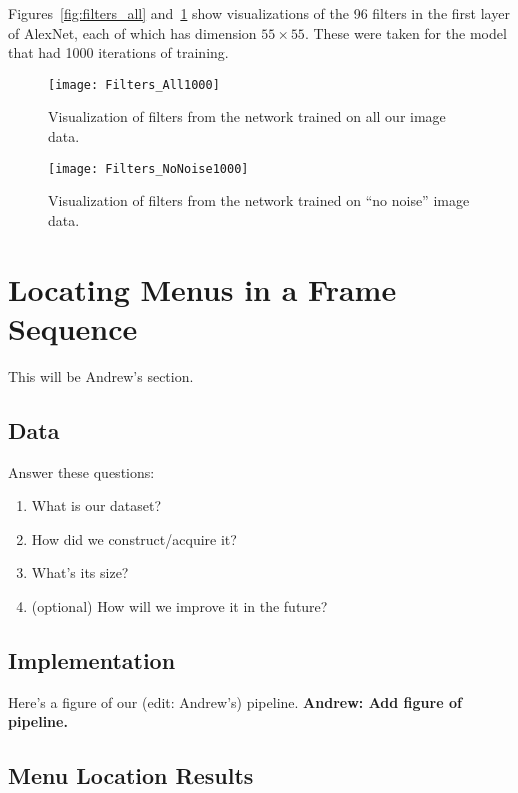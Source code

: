 \documentclass[10pt]{article}
\begin{document}
Figures~\ref{fig:filters_all} and~\ref{fig:filters_nonoise} show visualizations of the 96 filters in
the first layer of AlexNet, each of which has dimension $55\times 55$. These were taken for the
model that had 1000 iterations of training.

\begin{figure}[b]
\centering
  \begin{minipage}{.45\textwidth}
  \centering
  \texttt{[image: Filters\_All1000]}
  \caption{Visualization of filters from the network trained on all our image data.}
  \label{fig:filters_all}
  \end{minipage}\hfill
  \begin{minipage}{.45\textwidth}
  \centering
  \texttt{[image: Filters\_NoNoise1000]}
  \caption{Visualization of filters from the network trained on ``no noise'' image data.}
  \label{fig:filters_nonoise}
  \end{minipage}
\end{figure}


\section{Locating Menus in a Frame Sequence}

This will be Andrew's section.

\subsection{Data}

Answer these questions:
\begin{enumerate}[noitemsep]
\item What is our dataset?
\item How did we construct/acquire it?
\item What's its size?
\item (optional) How will we improve it in the future?
\end{enumerate}


\subsection{Implementation}
Here's a figure of our (edit: Andrew's) pipeline.  \textbf{Andrew: Add figure of pipeline.}

\subsection{Menu Location Results}
\end{document}
